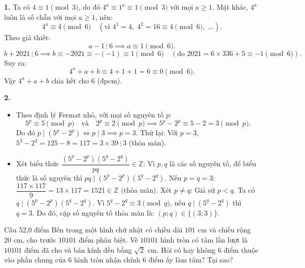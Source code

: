 \begin{loi_giai_cau}
\textbf{1.} Ta có $4 \equiv 1 \pmod 3$, do đó $4^a \equiv 1^a \equiv 1 \pmod 3$ với mọi $a \ge 1$.
Mặt khác, $4^a$ luôn là số chẵn với mọi $a \ge 1$, nên:
\[4^a \equiv 4 \pmod 6 \quad (\text{vì } 4^1 = 4,\; 4^2 = 16 \equiv 4 \pmod 6,\;\dots).\]
Theo giả thiết:
\[a - 1 \ \vdots \ 6 \implies a \equiv 1 \pmod 6.\]
\[b + 2021 \ \vdots \ 6 \implies b \equiv -2021 \equiv -(-1) \equiv 1 \pmod 6 \quad (\text{do } 2021 = 6 \times 336 + 5 \equiv -1 \pmod 6).\]
Suy ra:
\[4^a + a + b \equiv 4 + 1 + 1 = 6 \equiv 0 \pmod 6.\]
Vậy $4^a + a + b$ chia hết cho 6 (đpcm).

\textbf{2.}
\begin{itemize}
\item Theo định lý Fermat nhỏ, với mọi số nguyên tố $p$:
\[5^p \equiv 5 \pmod p \quad \text{và} \quad 2^p \equiv 2 \pmod p \implies 5^p - 2^p \equiv 5 - 2 = 3 \pmod p.\]
Do đó $p \mid (5^p - 2^p) \iff p \mid 3 \implies \boxed{p = 3}$.
Thử lại: Với $p = 3$, $5^3 - 2^3 = 125 - 8 = 117 = 3 \times 39 \ \vdots \ 3$ (thỏa mãn).
\item Xét biểu thức $\dfrac{(5^p-2^p)(5^q-2^q)}{pq} \in \mathbb{Z}$:
Vì $p, q$ là các số nguyên tố, để biểu thức là số nguyên thì $pq \mid (5^p-2^p)(5^q-2^q)$.
Nếu $p = q = 3$: $\dfrac{117 \times 117}{9} = 13 \times 117 = 1521 \in \mathbb{Z}$ (thỏa mãn).
Xét $p \neq q$: Giả sử $p < q$. Ta có $q \mid (5^p-2^p)(5^q-2^q)$.
Vì $5^q - 2^q \equiv 3 \pmod q$, nếu $q \mid (5^q - 2^q)$ thì $q = 3$.
Do đó, cặp số nguyên tố thỏa mãn là: $\boxed{(p; q) \in \{(3; 3)\}}$.
\end{itemize}
\end{loi_giai_cau}

\begin{de_cau}{Câu 5}{2,0 điểm}
Bên trong một hình chữ nhật có chiều dài $101\text{ cm}$ và chiều rộng $20\text{ cm}$, cho trước $10101$ điểm phân biệt. Vẽ $10101$ hình tròn có tâm lần lượt là $10101$ điểm đã cho và bán kính đều bằng $\sqrt{2}\text{ cm}$. Hỏi có hay không 6 điểm thuộc vào phần chung của 6 hình tròn nhận chính 6 điểm ấy làm tâm? Tại sao?
\end{de_cau}

